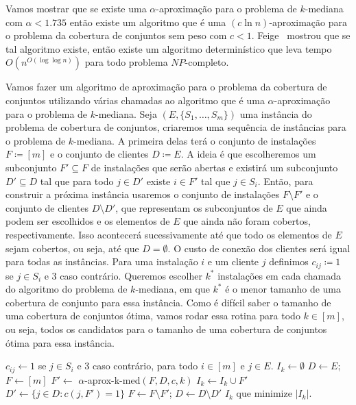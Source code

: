 Vamos mostrar que se existe uma $\alpha$-aproximação para o problema de $k$-mediana com $\alpha < 1.735$ então existe um algoritmo que é uma $(c \ln n)$-aproximação para o problema da cobertura de conjuntos sem peso com $c<1$. 
Feige~\cite{Feige98} mostrou que se tal algoritmo existe, então existe um algoritmo determinístico que leva tempo $O(n^{O(\log\log n)})$ para todo problema $NP$-completo.

Vamos fazer um algoritmo de aproximação para o problema da cobertura de conjuntos utilizando várias chamadas ao algoritmo que é uma $\alpha$-aproximação para o problema de $k$-mediana. 
Seja $(E,\{S_1,\ldots,S_m\})$ uma instância do problema de cobertura de conjuntos, criaremos uma sequência de instâncias para o problema de $k$-mediana. 
A primeira delas terá o conjunto de instalações $F \coloneqq [m]$ e o conjunto de clientes $D \coloneqq E$. 
A ideia é que escolheremos um subconjunto $F' \subseteq F$ de instalações que serão abertas e existirá um subconjunto $D' \subseteq D$ tal que para todo $j \in D'$ existe $i \in F'$ tal que $j \in S_i$. 
Então, para construir a próxima instância usaremos o conjunto de instalações $F \setminus F'$ e o conjunto de clientes $D \setminus D'$, que representam os subconjuntos de $E$ que ainda podem ser escolhidos e os elementos de $E$ que ainda não foram cobertos, respectivamente.
Isso acontecerá sucessivamente até que todo os elementos de $E$ sejam cobertos, ou seja, até que $D = \emptyset$.
O custo de conexão dos clientes será igual para todas as instâncias. Para uma instalação $i$ e um cliente $j$ definimos $c_{ij}\coloneqq 1$ se $j \in S_i$ e $3$ caso contrário.
Queremos escolher $k^*$ instalações em cada chamada do algoritmo do problema de $k$-mediana, em que $k^*$ é o menor tamanho de uma cobertura de conjunto para essa instância. Como é difícil saber o tamanho de uma cobertura de conjuntos ótima, vamos rodar essa rotina para todo $k \in [m]$, ou seja, todos os candidatos para o tamanho de uma cobertura de conjuntos ótima para essa instância.

\begin{algorithm}
    \caption{}
    \begin{algorithmic}[1]
        \State $c_{ij} \gets 1$ se $j \in S_i$ e 3 caso contrário, para todo $i \in [m]$ e $j \in E$.
            \State $I_k \gets \emptyset$
            \State $D \gets E$; $F \gets [m]$
                \State $F' \gets$ {\sc $\alpha$-aprox-k-med}$(F,D,c,k)$
                \State $I_k \gets I_k \cup F'$
                \State $D' \gets \{j \in D: c(j,F') = 1 \}$
                \State $F \gets F \setminus F'$; $D\gets D\setminus D'$
            \EndWhile
        \EndFor
    \State \Return $I_k$ que minimize $|I_k|$.
    \end{algorithmic}
\end{algorithm}


